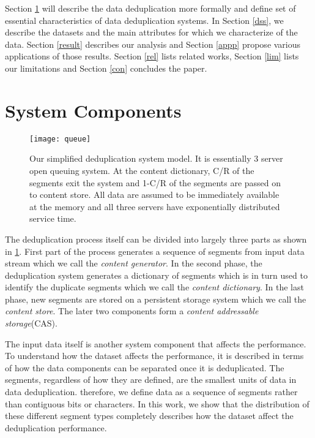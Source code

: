 Section \ref{sys} will describe the data deduplication more formally and define set of essential characteristics of data deduplication systems. In Section \ref{dss}, we describe the datasets and the main attributes for which we characterize of the data. Section \ref{result} describes our analysis and Section \ref{appp} propose various applications of those results. Section \ref{rel} lists related works, Section \ref{lim} lists our limitations and Section \ref{con} concludes the paper.

\section{System Components}\label{sys}

\begin{figure}[!t]
\centering
\texttt{[image: queue]}
\caption{Our simplified deduplication system model. It is essentially 3 server open queuing system. At the content dictionary, C/R of the segments exit the system and 1-C/R of the segments are passed on to content store. All data are assumed to be immediately available at the memory and all three servers have exponentially distributed service time.} 
\label{queue}
\end{figure}

The deduplication process itself can be divided into largely three parts as shown in \figurename \ref{queue}. First part of the process generates a sequence of segments from input data stream which we call the \emph{content generator}. In the second phase, the deduplication system generates a dictionary of segments which is in turn used to identify the duplicate segments which we call the \emph{content dictionary}. In the last phase, new segments are stored on a persistent storage system which we call the \emph{content store}. The later two components form a \emph{content addressable storage}(CAS).

The input data itself is another system component that affects the performance. To understand how the dataset affects the performance, it is described in terms of how the data components can be separated once it is deduplicated. The segments, regardless of how they are defined, are the smallest units of data in data deduplication. therefore, we define data as a sequence of segments rather than contiguous bits or characters. In this work, we show that the distribution of these different segment types completely describes how the dataset affect the deduplication performance.

